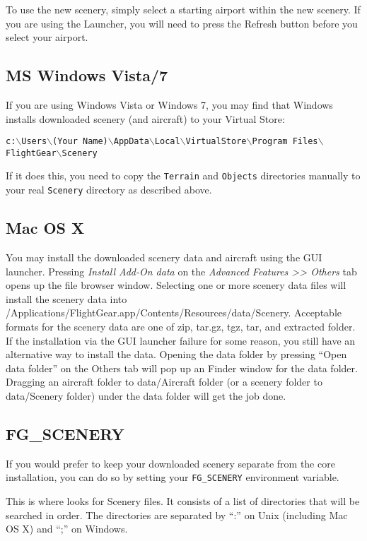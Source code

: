 To use the new scenery, simply select a starting airport within the new scenery.
If you are using the \FlightGear{} Launcher, you will need to press the Refresh
button before you select your airport.

\subsection{MS Windows Vista/7}
If you are using Windows Vista or Windows 7, you may find that Windows installs downloaded scenery
(and aircraft) to your Virtual Store:

\noindent
{ \footnotesize{\texttt{c:$\backslash$Users$\backslash$(Your
Name)$\backslash$AppData$\backslash$Local$\backslash$VirtualStore$\backslash$Program
Files$\backslash$FlightGear$\backslash$Scenery}}}

If it does this, you need to copy the \texttt{Terrain} and \texttt{Objects}
directories manually to your real \FlightGear{} \texttt{Scenery} directory
as described above.

\subsection{Mac OS X \label{sceneryOnMac}}
You may install the downloaded scenery data and aircraft using the GUI launcher. Pressing \textit{Install Add-On data} on the \textit{Advanced Features >> Others} tab opens up the file browser window. Selecting one or more scenery data files will install the scenery data into /Applications/FlightGear.app/Contents/Resources/data/Scenery. Acceptable formats for the scenery data are one of zip, tar.gz, tgz, tar, and extracted folder. If the installation via the GUI launcher failure for some reason, you still have an alternative way to install the data. Opening the data folder by pressing ``Open data folder'' on the Others tab will pop up an Finder window for the data folder. Dragging an aircraft folder to data/Aircraft folder (or a scenery folder to data/Scenery folder) under the data folder will get the job done.

\subsection{FG\_SCENERY}

If you would prefer to keep your downloaded scenery separate from the core
installation, you can do so by setting your \texttt{FG\_SCENERY} environment
variable.

This is where \FlightGear{} looks for Scenery files. It consists of a list
of directories that will be searched in order. The directories are separated
by ``:'' on Unix (including Mac OS X) and ``;'' on Windows.

